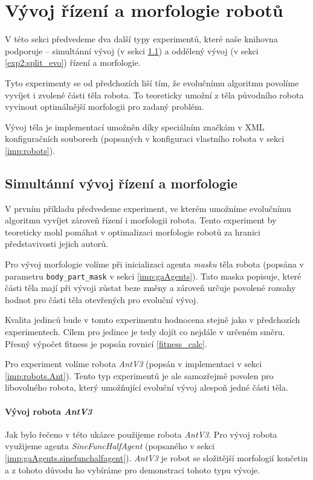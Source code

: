 \section{Vývoj řízení a morfologie robotů} \label{exp2}

V této sekci předvedeme dva další typy experimentů, které naše knihovna
podporuje -- simultánní vývoj (v sekci \ref{exp2:para_evo}) a oddělený
vývoj (v sekci \ref{exp2:split_evo}) řízení a morfologie.

Tyto experimenty se od předchozích liší tím, že evolučnímu algoritmu povolíme
vyvíjet i zvolené části těla robota. To teoreticky umožní z těla původního
robota vyvinout optimálnější morfologii pro zadaný problém.

Vývoj těla je implementací umožněn díky speciálním značkám v XML konfiguračních
souborech (popsaných v konfiguraci vlastního robota v sekci \ref{imp:robots}).

\subsection{Simultánní vývoj řízení a morfologie} \label{exp2:para_evo}

V prvním příkladu předvedeme experiment, ve kterém umožníme evolučnímu
algoritmu vyvíjet zároveň řízení i morfologii robota. Tento experiment by
teoreticky mohl pomáhat v optimalizaci morfologie robotů za hranici
představivosti jejich autorů. 

Pro vývoj morfologie volíme při inicializaci agenta \emph{masku} těla
robota (popsána v parametru \texttt{body\_part\_mask} v sekci
\ref{imp:gaAgents}). Tato maska popisuje, které části těla mají při vývoji
zůstat beze změny a zároveň určuje povolené rozsahy hodnot pro části
těla otevřených pro evoluční vývoj.

Kvalita jedinců bude v tomto experimentu hodnocena stejně jako v předchozích
experimentech. Cílem pro jedince je tedy dojít co nejdále v určeném směru.
Přesný výpočet fitness je popsán rovnicí \ref{fitness_calc}. 

Pro experiment volíme robota \emph{AntV3} (popsán v implementaci v sekci
\ref{imp:robots.Ant}). Tento typ experimentů je ale samozřejmě povolen pro
libovolného robota, který umožňující evoluční vývoj alespoň jedné části těla.

\paragraph{Vývoj robota \emph{AntV3}}
Jak bylo řečeno v této ukázce použijeme robota \emph{AntV3}. Pro vývoj robota
využijeme agenta \emph{SineFuncHalfAgent} (popsaného v sekci
\ref{imp:gaAgents.sinefunchalfagent}). \emph{AntV3} je robot se složitější
morfologií končetin a z tohoto důvodu ho vybíráme pro demonstraci tohoto typu
vývoje.

